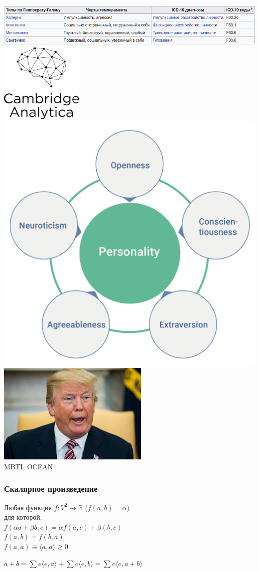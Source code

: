 \documentclass[14pt]{beamer}
\begin{document}
\begin{frame}
	\vspace{1em}
	\includegraphics[width=\textwidth]{holer.png}\\
	\vspace{1em}
	\includegraphics[width=0.2\linewidth]{camb.png}
	\hspace{3em}
	\includegraphics[width=0.2\linewidth]{ocean.png}
	\hspace{3em}
  \includegraphics[width=0.3\linewidth]{trump.jpeg}\\
	\vspace{1em}
	\textbullet \hspace{1pt} MBTI, OCEAN
\end{frame}

\begin{frame}
\frametitle{Скалярное произведение}
	Любая функция $f: V^2 \mapsto \mathbb{R}$ ($f(a,b)=\alpha$)\\
	для которой:\\
	\pause
	$f(\alpha a+\beta b,c)=\alpha f(a,c) +\beta(b,c)$\\
	$f(a,b)=\overline{f(b,a)}$\\
	$f(a,a)\equiv\langle a,a\rangle \geq0$\\
	\begin{center}
	$	a+b=\sum e\langle e,a \rangle +\sum e\langle e,b \rangle=
	\sum e\langle e,a +b \rangle$
	\end{center}
\end{frame}
\end{document}
